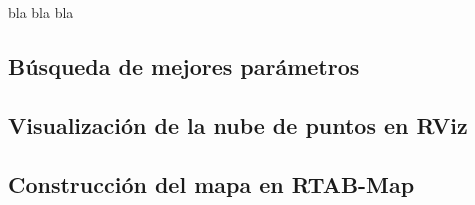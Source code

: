 

bla bla bla

\subsection{Búsqueda de mejores parámetros}


\subsection{Visualización de la nube de puntos en RViz}


\subsection{Construcción del mapa en RTAB-Map}



